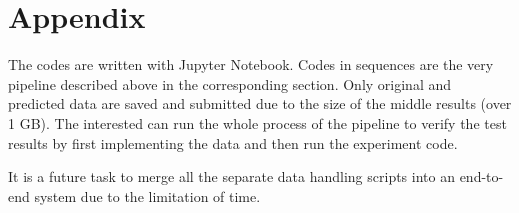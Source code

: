 \documentclass[11pt,a4paper]{article}
\begin{document}
%
%



\section*{Appendix}

The codes are written with Jupyter Notebook. Codes in sequences are the very pipeline described above in the corresponding section. Only original and predicted data are saved and submitted due to the size of the middle results (over 1 GB). The interested can run the whole process of the pipeline to verify the test results by first implementing the data and then run the experiment code.

It is a future task to merge all the separate data handling scripts into an end-to-end system due to the limitation of time.
\end{document}

